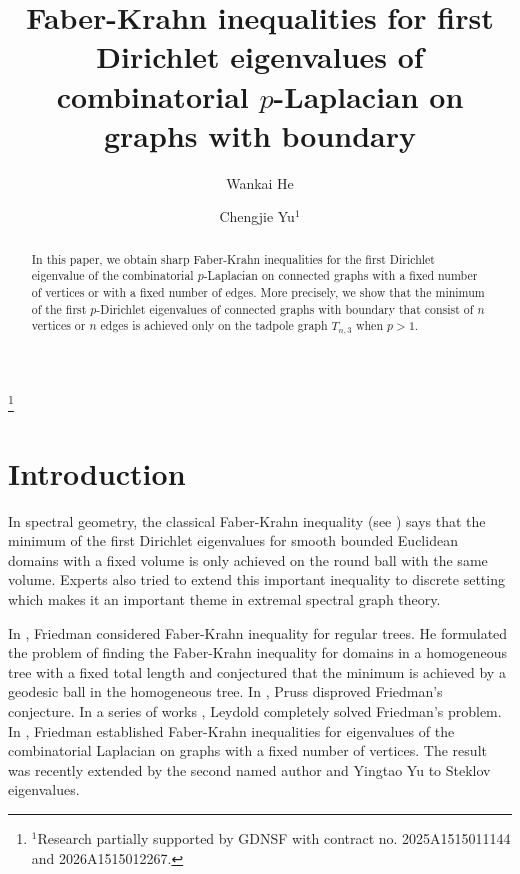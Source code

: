 \documentclass[12pt]{amsart}
\theoremstyle{definition}
\theoremstyle{remark}
\numberwithin{equation}{section}
\begin{document}
\title{Faber-Krahn inequalities for first Dirichlet eigenvalues of combinatorial $p$-Laplacian on graphs with boundary}

\author{Wankai He}
\address{Department of Mathematics, Shantou University, Shantou, Guangdong, 515063, China}
\author{Chengjie Yu$^1$}
\address{Department of Mathematics, Shantou University, Shantou, Guangdong, 515063, China}
\thanks{$^1$Research partially supported by GDNSF with contract no. 2025A1515011144 and 2026A1515012267.}
\renewcommand{\subjclassname}{%
  \textup{2020} Mathematics Subject Classification}
\date{}
\begin{abstract}
In this paper, we obtain sharp Faber-Krahn inequalities for the first Dirichlet eigenvalue of the combinatorial $p$-Laplacian on connected graphs with a fixed number of vertices or with a fixed number of edges. More precisely, we show that the minimum of the first $p$-Dirichlet eigenvalues of connected graphs with boundary that consist of $n$ vertices or $n$ edges is achieved only on the tadpole graph $T_{n,3}$ when $p>1$.
\end{abstract}
\maketitle
{}
\section{Introduction}
In spectral geometry, the classical Faber-Krahn inequality (see \cite[P. 87]{Ch}) says that the minimum of the first Dirichlet eigenvalues for smooth bounded Euclidean domains with a fixed volume is only achieved on the round ball with the same volume. Experts also tried  to extend this important inequality to discrete setting which  makes it an important theme in extremal spectral graph theory.

In \cite{Fr}, Friedman considered Faber-Krahn inequality for regular trees. He formulated the problem of finding the Faber-Krahn inequality for domains in a homogeneous tree with a fixed total length and conjectured that the minimum is achieved by a geodesic ball in the homogeneous tree. In \cite{Pr}, Pruss disproved Friedman's conjecture. In a series of works \cite{Le97,Le02}, Leydold completely solved Friedman's problem.  In \cite{Fr2}, Friedman established Faber-Krahn inequalities for eigenvalues of the combinatorial Laplacian on graphs with a fixed number of vertices. The result was recently extended by the second named author and Yingtao Yu \cite{YY} to Steklov eigenvalues.
\end{document}
